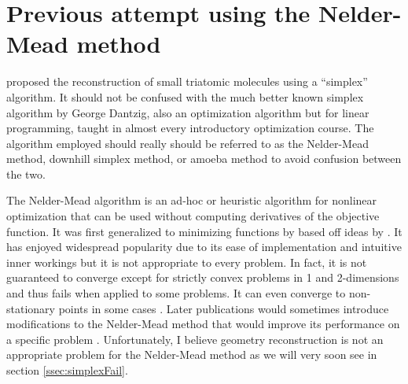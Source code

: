 \section{Previous attempt using the Nelder-Mead method}
\citet{Brichta09} proposed the reconstruction of small triatomic molecules using a ``simplex'' algorithm. It should not be confused with the much better known simplex algorithm by George Dantzig, also an optimization algorithm but for linear programming, taught in almost every introductory optimization course. The algorithm employed should really should be referred to as the Nelder-Mead method, downhill simplex method, or amoeba method to avoid confusion between the two.\footnotemark


The Nelder-Mead algorithm is an ad-hoc or heuristic algorithm for nonlinear optimization that can be used without computing derivatives of the objective function\footnotemark. It was first generalized to minimizing functions by \citet{Nelder65} based off ideas by \citet{Spendley62}. It has enjoyed widespread popularity due to its ease of implementation and intuitive inner workings but it is not appropriate to every problem. In fact, it is not guaranteed to converge except for strictly convex problems in 1 and 2-dimensions \citep{Lagarias98} and thus fails when applied to some problems. It can even converge to non-stationary points in some cases \citep{McKinnon98}. Later publications would sometimes introduce modifications to the Nelder-Mead method that would improve its performance on a specific problem \citet{Wright10}. Unfortunately, I believe geometry reconstruction is not an appropriate problem for the Nelder-Mead method as we will very soon see in section \ref{ssec:simplexFail}.



